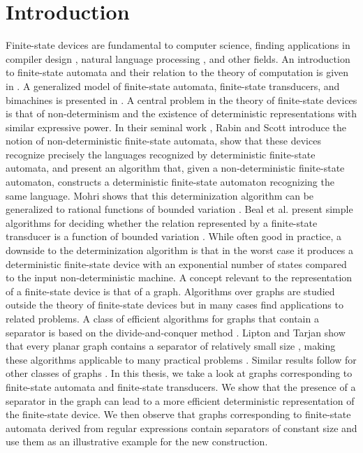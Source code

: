 \chapter{Introduction}

Finite-state devices are fundamental to computer science, finding applications in
compiler design \cite{aho_lam_sethi_ullman}, natural language processing
\cite{mohri_applications}, and other fields. An introduction to finite-state
automata and their relation to the theory of computation is given in
\cite{hopcroft_motwani_ullman}. A generalized model of finite-state automata,
finite-state transducers, and bimachines is presented in \cite{mihov_schulz}.
\bigbreak
A central problem in the theory of finite-state devices is that of non-determinism
and the existence of deterministic representations with similar expressive power.
In their seminal work \cite{rabin_scott}, Rabin and Scott introduce the notion of
non-deterministic finite-state automata, show that these devices recognize precisely
the languages recognized by deterministic finite-state automata, and present an
algorithm that, given a non-deterministic finite-state automaton, constructs a
deterministic finite-state automaton recognizing the same language. Mohri shows that
this determinization algorithm can be generalized to rational functions of bounded
variation \cite{mohri_applications}. Beal et al. present simple algorithms for
deciding whether the relation represented by a finite-state transducer is a function
of bounded variation \cite{beal}. While often good in practice, a downside to the
determinization algorithm is that in the worst case it produces a deterministic
finite-state device with an exponential number of states compared to the input
non-deterministic machine.
\bigbreak
A concept relevant to the representation of a finite-state device is that of a graph.
Algorithms over graphs are studied outside the theory of finite-state devices but in
many cases find applications to related problems. A class of efficient algorithms for
graphs that contain a separator is based on the divide-and-conquer method
\cite{aho_hopcroft}. Lipton and Tarjan show that every planar graph contains a
separator of relatively small size \cite{lipton_tarjan_theorem}, making these
algorithms applicable to many practical problems \cite{lipton_tarjan_applications}.
Similar results follow for other classes of graphs \cite{gilbert_hutchinson_tarjan}
\cite{alon_seymour_thomas}.
\bigbreak
In this thesis, we take a look at graphs corresponding to finite-state automata and
finite-state transducers. We show that the presence of a separator in the graph can
lead to a more efficient deterministic representation of the finite-state device. We
then observe that graphs corresponding to finite-state automata derived from regular
expressions \cite{thompson} contain separators of constant size and use them as an
illustrative example for the new construction. 
